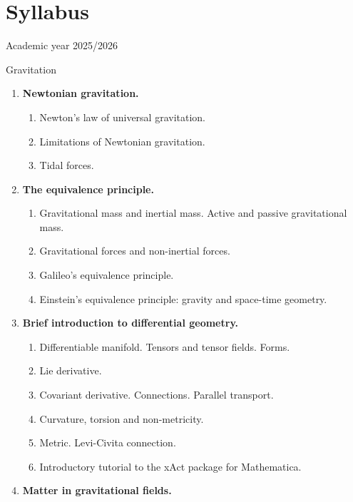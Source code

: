 \chapter*{Syllabus}

\hfill Academic year 2025/2026

\begin{center}\Large Gravitation\end{center}

\begin{enumerate}[label=\arabic*.,leftmargin=1.5em]
\item \textbf{Newtonian gravitation.}
  \begin{enumerate}[label=1.\arabic*.,leftmargin=2.5em,itemsep=0pt]
  \item Newton's law of universal gravitation.
  \item Limitations of Newtonian gravitation.
  \item Tidal forces.
  \end{enumerate}
\item \textbf{The equivalence principle.}
  \begin{enumerate}[label=2.\arabic*.,leftmargin=2.5em,itemsep=0pt]
  \item Gravitational mass and inertial mass. Active and passive gravitational mass.
  \item Gravitational forces and non-inertial forces.
  \item Galileo's equivalence principle.
  \item Einstein's equivalence principle: gravity and space-time geometry.
  \end{enumerate}
\item \textbf{Brief introduction to differential geometry.}
  \begin{enumerate}[label=3.\arabic*.,leftmargin=2.5em,itemsep=0pt]
  \item Differentiable manifold. Tensors and tensor fields. Forms.
  \item Lie derivative.
  \item Covariant derivative. Connections. Parallel transport.
  \item Curvature, torsion and non-metricity.
  \item Metric. Levi-Civita connection.
  \item Introductory tutorial to the xAct package for Mathematica.
  \end{enumerate}
\item \textbf{Matter in gravitational fields.}

\end{enumerate}
